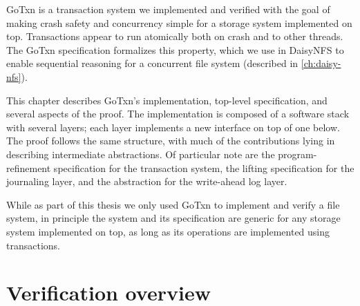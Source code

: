 GoTxn is a transaction system we implemented and verified with the goal of
making crash safety and concurrency simple for a storage system implemented on
top. Transactions appear to run atomically both on crash and to other threads.
The GoTxn specification formalizes this property, which we use in DaisyNFS to
enable sequential reasoning for a concurrent file system (described in
\cref{ch:daisy-nfs}).

This chapter describes GoTxn's implementation, top-level specification, and
several aspects of the proof. The implementation is composed of a software stack
with several layers; each layer implements a new interface on top of one
below. The proof follows the same structure, with much of the contributions
lying in describing intermediate abstractions. Of particular note are the
program-refinement specification for the transaction system, the lifting
specification for the journaling layer, and the abstraction for the write-ahead
log layer.

While as part of this thesis we only used GoTxn to implement and verify a file
system, in principle the system and its specification are generic for any
storage system implemented on top, as long as its operations are implemented
using transactions.





\section{Verification overview}%
\label{sec:gotxn:overview}


\resume

%



